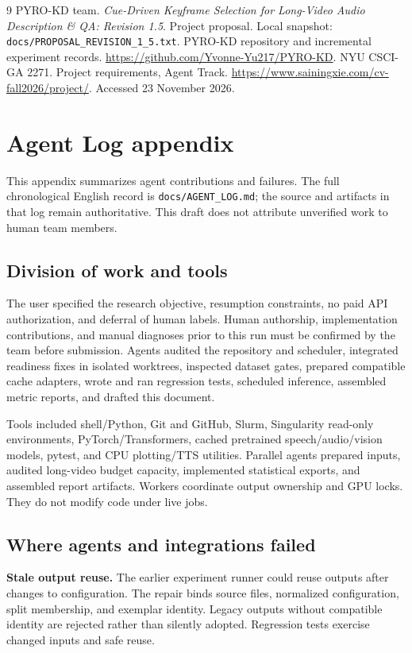 \documentclass[10pt,twocolumn]{article}
\begin{document}
\begin{thebibliography}{9}\small
{} PYRO-KD team. \emph{Cue-Driven Keyframe Selection for Long-Video Audio Description \& QA: Revision 1.5}. Project proposal. Local snapshot: \texttt{docs/PROPOSAL\_REVISION\_1\_5.txt}.
 PYRO-KD repository and incremental experiment records. \url{https://github.com/Yvonne-Yu217/PYRO-KD}.
 NYU CSCI-GA 2271. Project requirements, Agent Track. \url{https://www.sainingxie.com/cv-fall2026/project/}. Accessed 23 November 2026.
\end{thebibliography}

\clearpage
\appendix
\section{Agent Log appendix}
This appendix summarizes agent contributions and failures. The full chronological English record is \texttt{docs/AGENT\_LOG.md}; the source and artifacts in that log remain authoritative. This draft does not attribute unverified work to human team members.

\subsection{Division of work and tools}
The user specified the research objective, resumption constraints, no paid API authorization, and deferral of human labels. Human authorship, implementation contributions, and manual diagnoses prior to this run must be confirmed by the team before submission. Agents audited the repository and scheduler, integrated readiness fixes in isolated worktrees, inspected dataset gates, prepared compatible cache adapters, wrote and ran regression tests, scheduled inference, assembled metric reports, and drafted this document.

Tools included shell/Python, Git and GitHub, Slurm, Singularity read-only environments, PyTorch/Transformers, cached pretrained speech/audio/vision models, pytest, and CPU plotting/TTS utilities. Parallel agents prepared inputs, audited long-video budget capacity, implemented statistical exports, and assembled report artifacts. Workers coordinate output ownership and GPU locks. They do not modify code under live jobs.

\subsection{Where agents and integrations failed}
\textbf{Stale output reuse.} The earlier experiment runner could reuse outputs after changes to configuration. The repair binds source files, normalized configuration, split membership, and exemplar identity. Legacy outputs without compatible identity are rejected rather than silently adopted. Regression tests exercise changed inputs and safe reuse.
\end{document}
